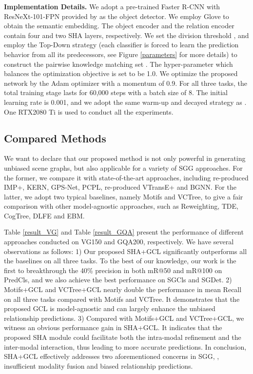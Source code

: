 \documentclass[10pt,twocolumn,letterpaper]{article}
\begin{document}
{\noindent\textbf{Implementation Details.} We adopt a pre-trained Faster R-CNN \cite{Ren2017Faster} with ResNeXt-101-FPN\cite{xie2017aggregated} provided by \cite{tang2020unbiased} as the object detector. We employ Glove\cite{pennington2014glove} to obtain the semantic embedding. The object encoder and the relation encoder contain four and two SHA layers, respectively. We set the division threshold , and employ the Top-Down strategy (each classifier is forced to learn the prediction behavior from all its predecessors, see Figure \ref{parameters} for more details) to construct the pairwise knowledge matching set . The hyper-parameter  which balances the optimization objective is set to be 1.0. We optimize the proposed network by the Adam optimizer with a momentum of 0.9. For all three tasks, the total training stage lasts for 60,000 steps with a batch size of 8. The initial learning rate is 0.001, and we adopt the same warm-up and decayed strategy as \cite{tang2020unbiased}. One RTX2080 Ti is used to conduct all the experiments.

\subsection{Compared Methods}
We want to declare that our proposed method is not only powerful in generating unbiased scene graphs, but also applicable for a variety of SGG approaches. For the former, we compare it with state-of-the-art approaches, including re-produced IMP+\cite{xu2017scene}, KERN\cite{chen2019knowledge}, GPS-Net\cite{lin2020gps}, PCPL\cite{yan2020pcpl}, re-produced VTransE+\cite{zhang2017visual} and BGNN\cite{li2021bipartite}. For the latter, we adopt two typical baselines, namely Motifs\cite{zellers2018neural} and VCTree\cite{tang2019learning}, to give a fair comparison with other model-agnostic approaches, such as Reweighting\cite{chiou2021recovering},  TDE\cite{tang2020unbiased}, CogTree\cite{yu2020cogtree}, DLFE\cite{chiou2021recovering} and EBM\cite{suhail2021energy}. 

Table \ref{result_VG} and Table \ref{result_GQA} present the performance of different approaches conducted on VG150 and GQA200, respectively. We have several observations as follows: 1) Our proposed SHA+GCL significantly outperforms all the baselines on all three tasks. To the best of our knowledge, our work is the first to breakthrough the 40\% precision in both mR@50 and mR@100 on PredCls, and we also achieve the best performance on SGCls and SGDet. 2) Motifs+GCL and VCTree+GCL nearly double the performance in mean Recall on all three tasks compared with Motifs and VCTree. It demonstrates that the proposed GCL is model-agnostic and can largely enhance the unbiased relationship predictions. 3) Compared with Motifs+GCL and VCTree+GCL, we witness an obvious performance gain in SHA+GCL. It indicates that the proposed SHA module could facilitate both the intra-modal refinement and the inter-modal interaction, thus leading to more accurate predictions. In conclusion, SHA+GCL effectively addresses two aforementioned concerns in SGG, \ie, insufficient modality fusion and biased relationship predictions.

}
\end{document}
